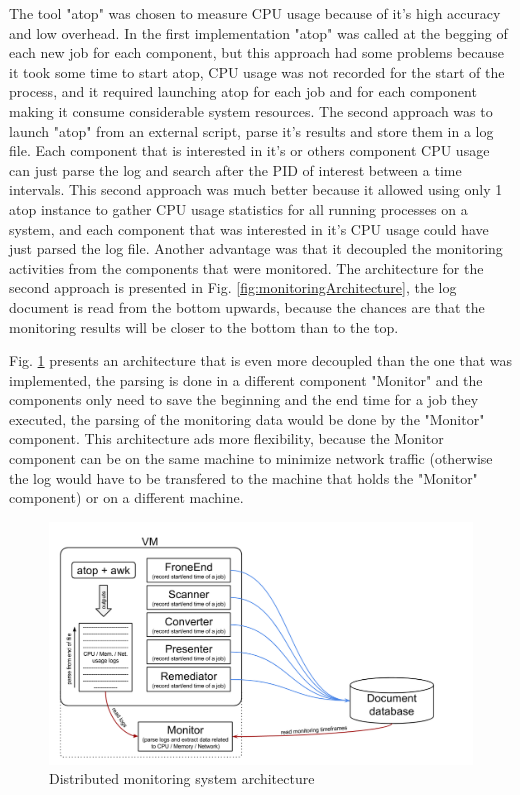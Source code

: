 The tool "atop" was chosen to measure CPU usage because of it's high accuracy and low overhead. In the first implementation "atop" was called at the begging of each new job for each component, but this approach had some problems because it took some time to start atop, CPU usage was not recorded for the start of the process, and it required launching atop for each job and for each component making it consume considerable system resources. The second approach was to launch "atop" from an external script, parse it's results and store them in a log file. Each component that is interested in it's or others component CPU usage can just parse the log and search after the PID of interest between a time intervals. This second approach was much better because it allowed using only 1 atop instance to gather CPU usage statistics for all running processes on a system, and each component that was interested in it's CPU usage could have just parsed the log file. Another advantage was that it decoupled the monitoring activities from the components that were monitored. The architecture for the second approach is presented in Fig. \ref{fig:monitoringArchitecture}, the log document is read from the bottom upwards, because the chances are that the monitoring results will be closer to the bottom than to the top.

Fig. \ref{fig:monitoringArchitectureExtended}  presents an architecture that is even more decoupled than the one that was implemented, the parsing is done in a different component "Monitor" and the components only need to save the beginning and the end time for a job they executed, the parsing of the monitoring data would be done by the "Monitor" component. This architecture ads more flexibility, because the Monitor component can be on the same machine to minimize network traffic (otherwise the log would have to be transfered to the machine that holds the "Monitor" component) or on a different machine.


\begin{figure}
\centering
\includegraphics[width=\linewidth]{./img/MonitoringCPUMechanismExtended.png}
\caption{Distributed monitoring system architecture}
\label{fig:monitoringArchitectureExtended}
\end{figure}
